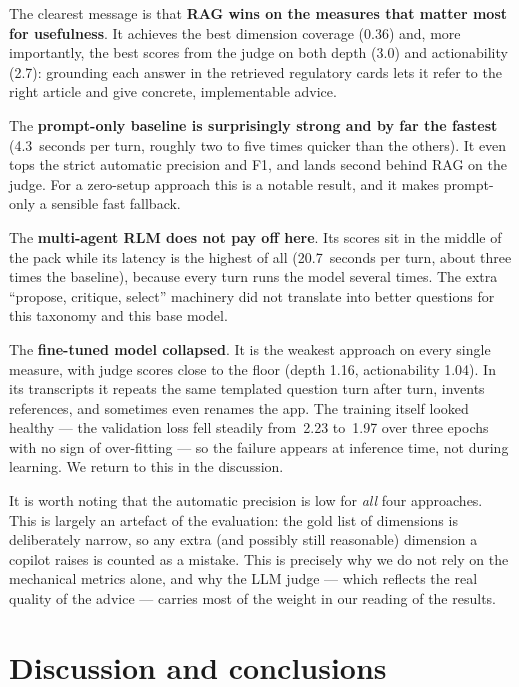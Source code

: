 \documentclass[11pt]{article}
\begin{document}
The clearest message is that \textbf{RAG wins on the measures that matter most for
usefulness}. It achieves the best dimension coverage (0.36) and, more importantly, the
best scores from the judge on both depth (3.0) and actionability (2.7): grounding each
answer in the retrieved regulatory cards lets it refer to the right article and give
concrete, implementable advice.

The \textbf{prompt-only baseline is surprisingly strong and by far the fastest}
(4.3~seconds per turn, roughly two to five times quicker than the others). It even tops
the strict automatic precision and F1, and lands second behind RAG on the judge. For a
zero-setup approach this is a notable result, and it makes prompt-only a sensible fast
fallback.

The \textbf{multi-agent RLM does not pay off here}. Its scores sit in the middle of the
pack while its latency is the highest of all (20.7~seconds per turn, about three times the
baseline), because every turn runs the model several times. The extra ``propose, critique,
select'' machinery did not translate into better questions for this taxonomy and this base
model.

The \textbf{fine-tuned model collapsed}. It is the weakest approach on every single
measure, with judge scores close to the floor (depth 1.16, actionability 1.04). In its
transcripts it repeats the same templated question turn after turn, invents references,
and sometimes even renames the app. The training itself looked healthy --- the validation
loss fell steadily from~2.23 to~1.97 over three epochs with no sign of over-fitting --- so
the failure appears at inference time, not during learning. We return to this in the
discussion.

It is worth noting that the automatic precision is low for \emph{all} four approaches.
This is largely an artefact of the evaluation: the gold list of dimensions is deliberately
narrow, so any extra (and possibly still reasonable) dimension a copilot raises is counted
as a mistake. This is precisely why we do not rely on the mechanical metrics alone, and
why the LLM judge --- which reflects the real quality of the advice --- carries most of the
weight in our reading of the results.

\section{Discussion and conclusions}
\label{sec:discussion}
\end{document}
